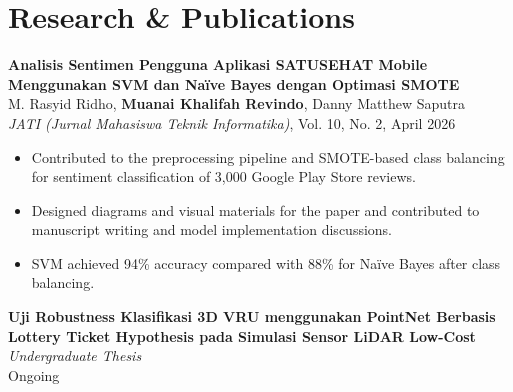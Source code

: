 \section*{Research \& Publications}

\textbf{Analisis Sentimen Pengguna Aplikasi SATUSEHAT Mobile
Menggunakan SVM dan Naïve Bayes dengan Optimasi SMOTE}\\
M. Rasyid Ridho, \textbf{Muanai Khalifah Revindo}, Danny Matthew Saputra\\
\textit{JATI (Jurnal Mahasiswa Teknik Informatika)}, Vol. 10, No. 2, April 2026

\begin{itemize}
    \item Contributed to the preprocessing pipeline and SMOTE-based
    class balancing for sentiment classification of 3,000 Google Play
    Store reviews.
    \item Designed diagrams and visual materials for the paper and
    contributed to manuscript writing and model implementation discussions.
    \item SVM achieved 94\% accuracy compared with 88\% for Naïve Bayes
    after class balancing.
\end{itemize}

\vspace{4pt}

\textbf{Uji Robustness Klasifikasi 3D VRU menggunakan PointNet
Berbasis Lottery Ticket Hypothesis pada Simulasi Sensor LiDAR Low-Cost}\\
\textit{Undergraduate Thesis}\\
Ongoing